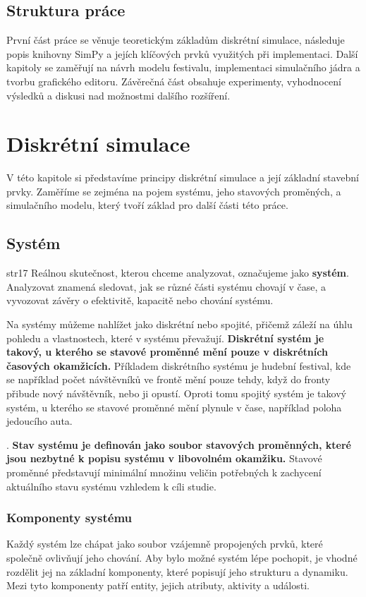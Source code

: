 \documentclass[
  program=itp,
  biblatex,
  figures=false,
  glossaries,
  index
]{kidiplom}
\begin{document}
\subsection{Struktura práce}
První část práce se věnuje teoretickým základům diskrétní simulace, následuje popis knihovny SimPy a jejích klíčových prvků využitých při implementaci. Další kapitoly se zaměřují na návrh modelu festivalu, implementaci simulačního jádra a tvorbu grafického editoru. Závěrečná část obsahuje experimenty, vyhodnocení výsledků a diskusi nad možnostmi dalšího rozšíření.


\section{Diskrétní simulace}
V této kapitole si představíme principy diskrétní simulace a její základní stavební prvky. Zaměříme se zejména na pojem systému, jeho stavových proměných, a simulačního modelu, který tvoří základ pro další části této práce.

\subsection{Systém} str17
Reálnou skutečnost, kterou chceme analyzovat, označujeme jako {\bf systém}. Analyzovat znamená sledovat, jak se různé části systému chovají v čase, a vyvozovat závěry o efektivitě, kapacitě nebo chování systému.

Na systémy můžeme nahlížet jako diskrétní nebo spojité, přičemž záleží na úhlu pohledu a vlastnostech, které v systému převažují. {\bf Diskrétní systém je takový, u kterého se stavové proměnné mění pouze v diskrétních časových okamžicích.} Příkladem diskrétního systému je hudební festival, kde se například počet návštěvníků ve frontě mění pouze tehdy, když do fronty přibude nový návštěvník, nebo ji opustí.  Oproti tomu spojitý systém je takový systém, u kterého se stavové proměnné mění plynule v čase, například poloha jedoucího auta. 

. {\bf Stav systému je definován jako soubor stavových proměnných, které jsou nezbytné k popisu systému v libovolném okamžiku.} Stavové proměnné představují minimální množinu veličin potřebných k zachycení aktuálního stavu systému vzhledem k cíli studie.


\subsubsection{Komponenty systému}
Každý systém lze chápat jako soubor vzájemně propojených prvků, které společně ovlivňují jeho chování. Aby bylo možné systém lépe pochopit, je vhodné rozdělit jej na základní komponenty, které popisují jeho strukturu a dynamiku. Mezi tyto komponenty patří entity, jejich atributy, aktivity a události.
\end{document}
